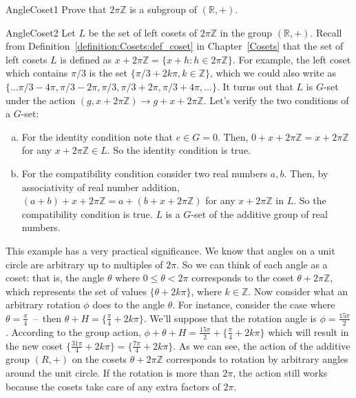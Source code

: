 \begin{exercise}{AngleCoset1}
Prove that $2 \pi \mathbb{Z}$ is a subgroup of $(\mathbb{R},+)$.
\end{exercise}
\begin{example}{AngleCoset2}
Let $L$ be the set of left cosets of $2\pi \mathbb{Z}$ in the group $(\mathbb{R},+)$.  Recall from Definition~\ref{definition:Cosets:def_coset} in Chapter~\ref{Cosets} that the set of left cosets $L$ is defined as $x+2\pi \mathbb{Z}=\{x+h:h\in 2\pi\mathbb{Z}\}$.  For example, the left coset which contains $\pi/3$ is the set $ \{\pi/3 +2k\pi, k\in \mathbb{Z}\}$, which we could also write as $\{ \ldots \pi/3-4\pi, \pi/3-2\pi, \pi/3, \pi/3+2\pi, \pi/3 + 4\pi, \ldots \}$.  It turns out that $L$ is $G$-set under the action  
$(g,x+2\pi\mathbb{Z}) \rightarrow g+x+2\pi\mathbb{Z}$. Let's verify the two conditions of a $G$-set:
\begin{enumerate}[(a)]
\item
For the identity condition note that $e\in G=0$. Then, $0+x+2\pi\mathbb{Z}=x+2\pi\mathbb{Z}$ for any $x+2\pi\mathbb{Z}\in L$.  So the identity condition is true.
\item 
For the compatibility condition consider two real numbers $a,b$.  Then, by associativity of real number addition, $(a+b)+x+2\pi\mathbb{Z}=a+(b+x+2\pi\mathbb{Z})$ for any $x+2\pi\mathbb{Z}$  in $L$.  So the compatibility condition is true.  $L$ is a $G$-set of the additive group of real numbers.
\end {enumerate}
This example has a very practical significance. We know that angles on a unit circle are arbitrary up to multiples of $2\pi$. So we can think of each angle as a coset:  that is, the angle $\theta$ where $0\leq\theta<2\pi$ corresponds to  the coset $\theta + 2\pi \mathbb{Z}$, which represents the set of values $\{\theta +2k\pi\}$, where $k \in \mathbb{Z}$. Now consider what an arbitrary rotation $\phi$ does to the angle $\theta$. For instance, consider the case where $\theta=\frac{\pi}{4}$~--~then $\theta+H=\{ \frac{\pi}{4}+2k\pi\}$.  We'll suppose that the rotation angle is $\phi=\frac{15\pi}{2}$.  According to the group action, $\phi+\theta+H =\frac{15\pi}{2}+\{\frac{\pi}{4}+2k\pi\}$ which will result in the new coset $\{\frac{31\pi}{4}+2k\pi\}=\{\frac{7\pi}{4}+2k\pi\}$.
As we can see, the action of the additive group $(R,+)$ on the cosets $\theta + 2\pi \mathbb{Z}$ corresponds to rotation by arbitrary angles around the unit circle. If the rotation is more than $2 \pi$, the action still works because the cosets take care of any extra factors of $2 \pi$.
\end {example}

